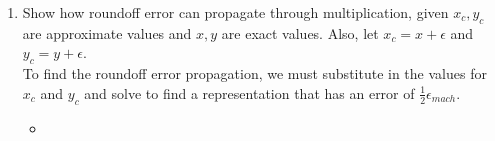 \documentclass[12pt]{article}
\begin{document}
\begin{enumerate}
		\item Show how roundoff error can propagate through multiplication, given $x_c, y_c$ are approximate values and $x,y$ are exact values. Also, let $x_c = x + \epsilon$ and $y_c = y + \epsilon$. \\
	
	To find the roundoff error propagation, we must substitute in the values for $x_c$ and $y_c$ and solve to find a representation that has an error of $\frac{1}{2} \epsilon_{mach}$.
		\begin{itemize}
			\item[]
		\end{itemize}
		
\end{enumerate}
\end{document}

